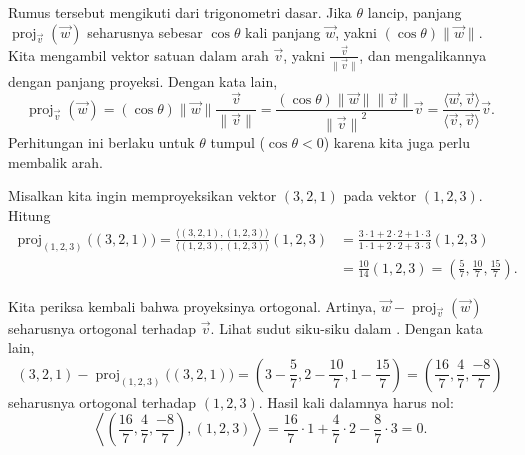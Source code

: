 Rumus tersebut mengikuti dari trigonometri dasar. Jika $\theta$ lancip, panjang
$\operatorname{proj}_{\vec{v}}(\vec{w})$ seharusnya
sebesar $\cos \theta$ kali panjang $\vec{w}$, yakni $(\cos
\theta)\lVert\vec{w}\rVert$.
Kita mengambil vektor satuan dalam arah $\vec{v}$, yakni
$\frac{\vec{v}}{\lVert \vec{v} \rVert}$, dan mengalikannya dengan panjang
proyeksi. Dengan kata lain,
\begin{equation*}
\operatorname{proj}_{\vec{v}}(\vec{w})
=
(\cos \theta) \lVert \vec{w} \rVert
\frac{\vec{v}}{\lVert \vec{v} \rVert}
=
\frac{(\cos \theta) \lVert \vec{w} \rVert \lVert \vec{v} \rVert}{
{\lVert \vec{v} \rVert}^2
}
\vec{v}
=
\frac{\langle \vec{w}, \vec{v} \rangle}{
\langle \vec{v}, \vec{v} \rangle
}
\vec{v} .
\end{equation*}
Perhitungan ini berlaku untuk $\theta$ tumpul ($\cos \theta < 0$)
karena kita juga perlu membalik arah.

\begin{example}
Misalkan kita ingin memproyeksikan vektor $(3,2,1)$ pada vektor $(1,2,3)$.
Hitung
\begin{equation*}
\begin{split}
\operatorname{proj}_{(1,2,3)} \bigl( (3,2,1) \bigr)
=
\frac{\langle (3,2,1) , (1,2,3) \rangle}{\langle (1,2,3) , (1,2,3) \rangle}
(1,2,3)
& =
\frac{3 \cdot 1 + 2 \cdot 2 + 1 \cdot 3}{ 1 \cdot 1 + 2 \cdot 2 + 3 \cdot 3}
(1,2,3)
\\
& =
\frac{10}{14}
(1,2,3)
=
\left(\frac{5}{7},\frac{10}{7},\frac{15}{7}\right) .
\end{split}
\end{equation*}

Kita periksa kembali bahwa proyeksinya ortogonal. Artinya,
$\vec{w}-\operatorname{proj}_{\vec{v}}(\vec{w})$ seharusnya ortogonal terhadap
$\vec{v}$.
Lihat sudut siku-siku dalam . Dengan kata lain,
\begin{equation*}
(3,2,1) - \operatorname{proj}_{(1,2,3)} \bigl( (3,2,1) \bigr)
=
\left(3-\frac{5}{7},2-\frac{10}{7},1-\frac{15}{7}\right)
=
\left(\frac{16}{7},\frac{4}{7},\frac{-8}{7}\right)
\end{equation*}
seharusnya ortogonal terhadap $(1,2,3)$. Hasil kali dalamnya harus nol:
\begin{equation*}
\left\langle
\left(\frac{16}{7},\frac{4}{7},\frac{-8}{7}\right)
,
(1,2,3)
\right\rangle
=
\frac{16}{7} \cdot 1 + \frac{4}{7} \cdot 2 -\frac{8}{7} \cdot 3
=
0 .
\end{equation*}
\end{example}

